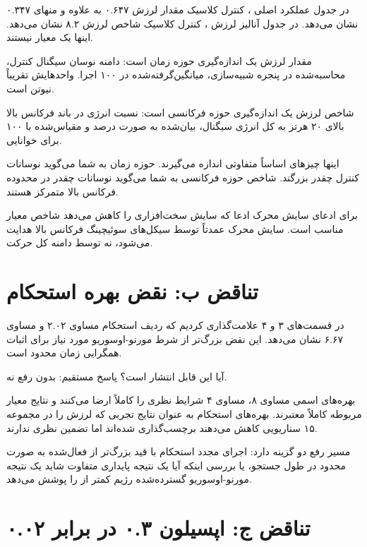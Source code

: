 \documentclass[12pt, a4paper]{article}
\newcommand{\dash}{\lr{---}}
\begin{document}
در جدول عملکرد اصلی ، کنترل کلاسيک مقدار لرزش ۰.۶۴۷ به علاوه و منهای ۰.۳۴۷ نشان می‌دهد. در جدول آناليز لرزش ، کنترل کلاسيک شاخص لرزش ۸.۲ نشان می‌دهد. اينها يک معيار نيستند.

مقدار لرزش  يک اندازه‌گيری حوزه زمان است: دامنه  نوسان سيگنال کنترل، محاسبه‌شده در پنجره شبيه‌سازی، ميانگين‌گرفته‌شده در ۱۰۰ اجرا. واحدهايش تقريباً نيوتن است.

شاخص لرزش  يک اندازه‌گيری حوزه فرکانسی است: نسبت انرژی در باند فرکانس بالا بالای ۲۰ هرتز به کل انرژی سيگنال، بيان‌شده به صورت درصد و مقياس‌شده با ۱۰۰ برای خوانايی.

اينها چيزهای اساساً متفاوتی اندازه می‌گيرند.  حوزه زمان به شما می‌گويد نوسانات کنترل چقدر بزرگند. شاخص حوزه فرکانسی به شما می‌گويد نوسانات چقدر در محدوده فرکانس بالا متمرکز هستند.

برای ادعای سايش محرک \dash{} ادعا که  سايش سخت‌افزاری را کاهش می‌دهد \dash{} شاخص  معيار مناسب است. سايش محرک عمدتاً توسط سيکل‌های سوئيچينگ فرکانس بالا هدايت می‌شود، نه توسط دامنه کل حرکت.

\section{تناقض ب: نقض بهره  استحکام}

در قسمت‌های ۳ و ۴ علامت‌گذاری کرديم که رديف استحکام   مساوی ۲.۰۲ و  مساوی ۶.۶۷ نشان می‌دهد. اين نقض  بزرگ‌تر از  شرط مورنو-اوسوريو مورد نياز برای اثبات همگرايی زمان محدود است.

آيا اين قابل انتشار است؟ پاسخ مستقيم: بدون رفع نه.

بهره‌های اسمی  \dash{}  مساوی ۸،  مساوی ۴ \dash{} شرايط نظری را کاملاً ارضا می‌کنند و نتايج معيار مربوطه کاملاً معتبرند. بهره‌های استحکام به عنوان نتايج تجربی که لرزش را در مجموعه ۱۵ سناريويی کاهش می‌دهند برچسب‌گذاری شده‌اند اما تضمين نظری ندارند.

مسير رفع دو گزينه دارد: اجرای مجدد  استحکام با قيد  بزرگ‌تر از  فعال‌شده به صورت محدود در طول جستجو، يا بررسی اينکه آيا يک نتيجه پايداری متفاوت \dash{} شايد يک نتيجه مورنو-اوسوريو گسترده‌شده \dash{} رژيم  کمتر از  را پوشش می‌دهد.

\section{تناقض ج: اپسيلون ۰.۳ در برابر ۰.۰۲}
\end{document}

